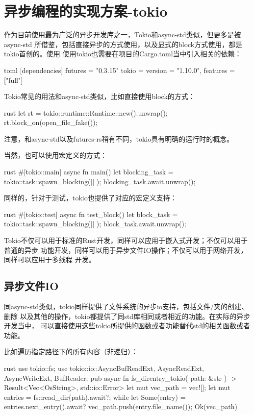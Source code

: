 \section{异步编程的实现方案-tokio}
作为目前使用最为广泛的异步开发库之一，Tokio和async-std类似，但更多是被async-std
所借鉴，包括直接异步的方式使用，以及显式的block方式使用，都是tokio首创的。使用
使用tokio也需要在项目的Cargo.toml当中引入相关的依赖：
\begin{code-block}{toml}
[dependencies]
futures = "0.3.15"
tokio = { version = "1.10.0", features = ["full"]}
\end{code-block}

Tokio常见的用法和async-std类似，比如直接使用block的方式：
\begin{code-block}{rust}
let rt = tokio::runtime::Runtime::new().unwrap();
rt.block_on(open_file_fake());
\end{code-block}
注意，和async-std以及futures-rs稍有不同，tokio具有明确的运行时的概念。

当然，也可以使用宏定义的方式：
\begin{code-block}{rust}
#[tokio::main]
async fn main() {
    let blocking_task = tokio::task::spawn_blocking(|| {
    });
    blocking_task.await.unwrap();
}
\end{code-block}
同样的，针对于测试，tokio也提供了对应的宏定义支持：
\begin{code-block}{rust}
#[tokio::test]
async fn test_block() {
    let block_task = tokio::task::spawn_blocking(|| {});
    block_task.await.unwrap();
}
\end{code-block}
Tokio不仅可以用于标准的Rust开发，同样可以应用于嵌入式开发；不仅可以用于普通的异步
功能开发，同样可以用于异步文件IO操作；不仅可以用于网络开发，同样可以应用于多线程
开发。
\subsection{异步文件IO}
同async-std类似，tokio同样提供了文件系统的异步io支持，包括文件/夹的创建、删除
以及其他的操作，tokio都提供了同std库相同或者相近的功能。在实际的异步开发当中，
可以直接使用这些tokio所提供的函数或者功能替代std的相关函数或者功能。

比如遍历指定路径下的所有内容（非递归）：
\begin{code-block}{rust}
use tokio::fs;
use tokio::io::{AsyncBufReadExt, AsyncReadExt, AsyncWriteExt, BufReader};
pub async fn fs_direntry_tokio(
    path: &str
) -> Result<Vec<OsString>, std::io::Error> {
    let mut vec_path = vec![];
    let mut entries = fs::read_dir(path).await?;
    while let Some(entry) = entries.next_entry().await? {
        vec_path.push(entry.file_name());
    }
    Ok(vec_path)
}
\end{code-block}

